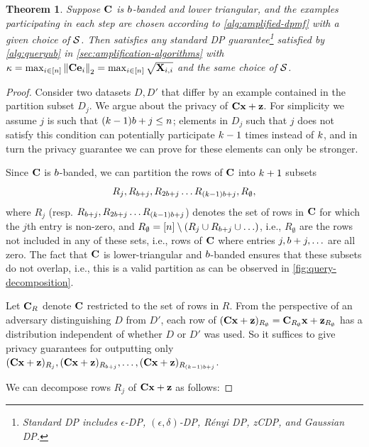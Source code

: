 \documentclass{article}
\newtheorem{theorem}{Theorem}
\begin{document}
\begin{theorem}\label{thm:general-amplification}
Suppose $\mathbf{C}$ is $b$-banded and lower triangular, and the examples participating in each step are chosen according to \cref{alg:amplified-dpmf} with a given choice of $\mathcal{S}$. Then \BANDMF satisfies any standard DP guarantee\footnote{Standard DP includes $\epsilon$-DP, $(\epsilon,\delta)$-DP, R\'enyi DP, zCDP, and Gaussian DP.} satisfied by \cref{alg:queryub} in \cref{sec:amplification-algorithms} with $\kappa = \max_{i \in [n]} \left\|\mathbf{C} \mathbf{e}_i\right\|_2 = \max_{i \in [n]} \sqrt{\mathbf{X}_{i,i}}$ and the same choice of $\mathcal{S}$.
\end{theorem}
\begin{proof}
Consider two datasets $D, D'$ that differ by an example contained in the partition subset $D_j$. We argue about the privacy of $\mathbf{C} \mathbf{x} + \mathbf{z}$. For simplicity we assume $j$ is such that $(k - 1) b + j \leq n$; elements in $D_j$ such that $j$ does not satisfy this condition can potentially participate $k - 1$ times instead of $k$, and in turn the privacy guarantee we can prove for these elements can only be stronger.
 
Since $\mathbf{C}$ is $b$-banded, we can partition the rows of $\mathbf{C}$ into $k + 1$ subsets \[R_j, R_{b + j}, R_{2 b + j} \ldots R_{(k - 1) b + j}, R_{\emptyset},\] where $R_j$ (resp. $R_{b + j}, R_{2 b + j} \ldots R_{(k - 1) b + j}$) denotes the set of rows in $\mathbf{C}$ for which the $j$th entry is non-zero, and $R_{\emptyset} = [n] \setminus (R_j \cup R_{b + j} \cup \ldots)$, i.e., $R_{\emptyset}$ are the rows not included in any of these sets, i.e., rows of $\mathbf{C}$ where entries $j, b + j, \ldots$ are all zero. The fact that $\mathbf{C}$ is lower-triangular and $b$-banded ensures that these subsets do not overlap, i.e., this is a valid partition as can be observed in \cref{fig:query-decomposition}. 

Let $\mathbf{C}_R$ denote $\mathbf{C}$ restricted to the set of rows in $R$. From the perspective of an adversary distinguishing $D$ from $D'$, each row of $(\mathbf{C} \mathbf{x} + \mathbf{z})_{R_{\emptyset}} = \mathbf{C}_{R_{\emptyset}} \mathbf{x} + \mathbf{z}_{R_{\emptyset}}$ has a distribution independent of whether $D$ or $D'$ was used. So it suffices to give privacy guarantees for outputting only $(\mathbf{C} \mathbf{x} + \mathbf{z})_{R_j}, (\mathbf{C} \mathbf{x} + \mathbf{z})_{R_{b + j}}, \ldots, (\mathbf{C} \mathbf{x} + \mathbf{z})_{R_{(k - 1) b + j}}$. 

We can decompose rows $R_j$ of $\mathbf{C} \mathbf{x} + \mathbf{z}$ as follows:


\end{proof}
\end{document}
